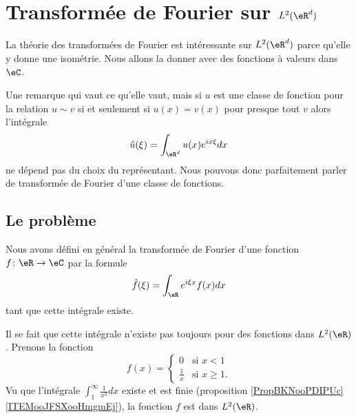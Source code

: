 \section{Transformée de Fourier sur \( L^2(\eR^d)\)}

La théorie des transformées de Fourier est intéressante sur \( L^2(\eR^d)\) parce qu'elle y donne une isométrie. Nous allons la donner avec des fonctions à valeurs dans \( \eC\).

\begin{remark}
    Une remarque qui vaut ce qu'elle vaut, mais si \( u\) est une classe de fonction pour la relation \( u\sim v\) si et seulement si \( u (x)=v(x)\) pour presque tout \( v\) alors l'intégrale
    \begin{equation}
        \hat u(\xi)=\int_{\eR^d}u(x) e^{ix\xi}dx
    \end{equation}
    ne dépend pas du choix du représentant. Nous pouvons donc parfaitement parler de transformée de Fourier d'une classe de fonctions.
\end{remark}

\subsection{Le problème}

Nous avons défini en général la transformée de Fourier d'une fonction \( f\colon \eR\to \eC\) par la formule
\begin{equation}        \label{EQooOPLJooEkqRuC}
    \hat f(\xi)=\int_{\eR} e^{i\xi x } f(x)dx
\end{equation}
tant que cette intégrale existe.

Il se fait que cette intégrale n'existe pas toujours pour des fonctions dans \( L^2(\eR)\). Prenons la fonction
\begin{equation}
    f(x)=\begin{cases}
        0    &   \text{si } x<1\\
        \frac{1}{ x }   &    \text{si } x\geq 1.
    \end{cases}
\end{equation}
Vu que l'intégrale \( \int_1^{\infty}\frac{1}{ x^2 }dx\) existe et est finie (proposition \ref{PropBKNooPDIPUc}\ref{ITEMooJFSXooHmgmEj}), la fonction \( f\) est dans \( L^2(\eR)\).

